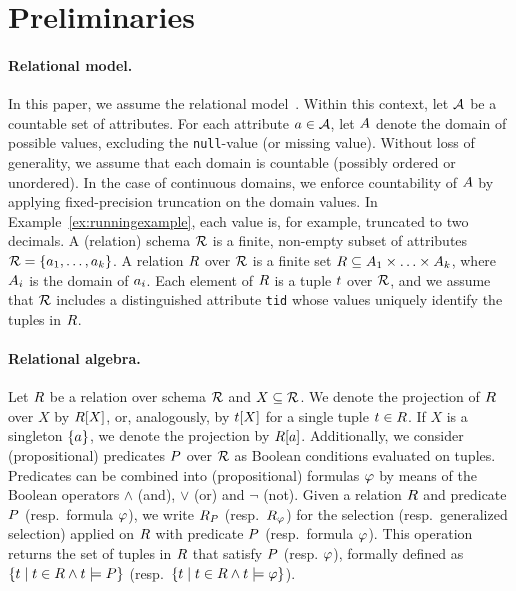 \section{Preliminaries}
\label{sec:preliminaries}

\paragraph{Relational model.}
In this paper, we assume the relational model~\cite{Codd1970}.
Within this context, let $\mathcal{A}$ be a countable set of attributes.
For each attribute $a \in \mathcal{A}$, let $A$ denote the domain of possible values, excluding the \texttt{null}-value (or missing value).
Without loss of generality, we assume that each domain is countable (possibly ordered or unordered).
In the case of continuous domains, we enforce countability of $A$ by applying fixed-precision truncation on the domain values.
In Example~\ref{ex:runningexample}, each value is, for example, truncated to two decimals.
A (relation) schema $\mathcal{R}$ is a finite, non-empty subset of attributes $\mathcal{R} = \{a_{1},\ldots,a_{k}\}$.
A relation $R$ over $\mathcal{R}$ is a finite set $R \subseteq A_{1} \times \ldots \times A_{k}$, where $A_{i}$ is the domain of $a_{i}$.
Each element of $R$ is a tuple $t$ over $\mathcal{R}$, and we assume that $\mathcal{R}$ includes a distinguished attribute \texttt{tid} whose values uniquely identify the tuples in $R$.

\paragraph{Relational algebra.}
Let $R$ be a relation over schema $\mathcal{R}$ and $X \subseteq \mathcal{R}$.
We denote the projection of $R$ over $X$ by $R[X]$, or, analogously, by $t[X]$ for a single tuple $t \in R$.
If $X$ is a singleton $\{a\}$, we denote the projection by $R[a]$.
Additionally, we consider (propositional) predicates $P$ over $\mathcal{R}$ as Boolean conditions evaluated on tuples.
Predicates can be combined into (propositional) formulas $\varphi$ by means of the Boolean operators $\wedge$ (and), $\vee$ (or) and $\neg$ (not).
Given a relation $R$ and predicate $P$ (resp.\ formula $\varphi$), we write $R_P$ (resp.\ $R_\varphi$) for the selection (resp.\ generalized selection) applied on $R$ with predicate $P$ (resp.\ formula $\varphi$).
This operation returns the set of tuples in $R$ that satisfy $P$ (resp. $\varphi$), formally defined as $\{t \mid t \in R \wedge t \models P \}$ (resp.\ $\{t \mid t \in R \wedge t \models \varphi \}$).

